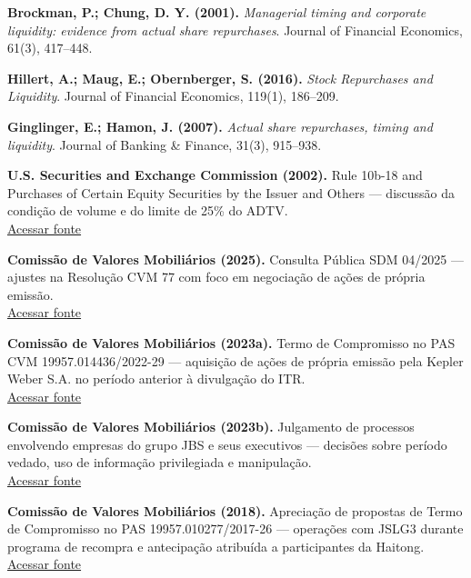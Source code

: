 \documentclass[
  a4paper,
]{article}
\begin{document}
\hypertarget{ref-7}{} \textbf{Brockman, P.; Chung, D. Y. (2001).}
\emph{Managerial timing and corporate liquidity: evidence from actual
share repurchases}. Journal of Financial Economics, 61(3), 417--448.

\hypertarget{ref-8}{} \textbf{Hillert, A.; Maug, E.; Obernberger, S.
(2016).} \emph{Stock Repurchases and Liquidity}. Journal of Financial
Economics, 119(1), 186--209.

\hypertarget{ref-9}{} \textbf{Ginglinger, E.; Hamon, J. (2007).}
\emph{Actual share repurchases, timing and liquidity}. Journal of
Banking \& Finance, 31(3), 915--938.

\hypertarget{ref-10}{} \textbf{U.S. Securities and Exchange Commission
(2002).} Rule 10b-18 and Purchases of Certain Equity Securities by the
Issuer and Others --- discussão da condição de volume e do limite de
25\% do ADTV.\\
\href{https://www.sec.gov/rules-regulations/2002/12/rule-10b-18-purchases-certain-equity-securities-issuer-others}{Acessar
fonte}

\hypertarget{ref-11}{} \textbf{Comissão de Valores Mobiliários (2025).}
Consulta Pública SDM 04/2025 --- ajustes na Resolução CVM 77 com foco em
negociação de ações de própria emissão.\\
\href{https://conteudo.cvm.gov.br/cvm_institucional/audiencias_publicas/ap_sdm/2025/sdm0425.html}{Acessar
fonte}

\hypertarget{ref-12}{} \textbf{Comissão de Valores Mobiliários (2023a).}
Termo de Compromisso no PAS CVM 19957.014436/2022-29 --- aquisição de
ações de própria emissão pela Kepler Weber S.A. no período anterior à
divulgação do ITR.\\
\href{https://www.gov.br/cvm/pt-br/assuntos/noticias/2023/cvm-aceita-proposta-conjunta-de-mais-de-r-900-mil-apresentada-por-kepler-weber-s-a-e-seu-diretor-de-relacoes-com-investidores}{Acessar
fonte}

\hypertarget{ref-13}{} \textbf{Comissão de Valores Mobiliários (2023b).}
Julgamento de processos envolvendo empresas do grupo JBS e seus
executivos --- decisões sobre período vedado, uso de informação
privilegiada e manipulação.\\
\href{https://www.gov.br/cvm/pt-br/assuntos/noticias/2023/cvm-conclui-julgamento-de-processos-envolvendo-empresas-do-grupo-jbs-e-seus-executivos}{Acessar
fonte}

\hypertarget{ref-14}{} \textbf{Comissão de Valores Mobiliários (2018).}
Apreciação de propostas de Termo de Compromisso no PAS
19957.010277/2017-26 --- operações com JSLG3 durante programa de
recompra e antecipação atribuída a participantes da Haitong.\\
\href{https://conteudo.cvm.gov.br/decisoes/2018/20180814_R1/20180814_D1023.html}{Acessar
fonte}
\end{document}
